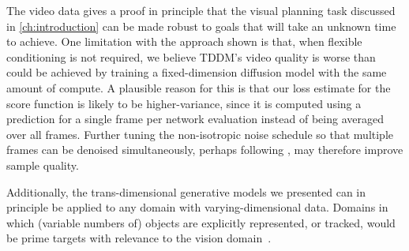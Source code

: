 The video data gives a proof in principle that the visual planning task discussed in \cref{ch:introduction} can be made robust to goals that will take an unknown time to achieve. One limitation with the approach shown is that, when flexible conditioning is not required, we believe TDDM's video quality is worse than could be achieved by training a fixed-dimension diffusion model with the same amount of compute. A plausible reason for this is that our loss estimate for the score function is likely to be higher-variance, since it is computed using a prediction for a single frame per network evaluation instead of being averaged over all frames. Further tuning the non-isotropic noise schedule so that multiple frames can be denoised simultaneously, perhaps following \citet{ruhe2024rolling}, may therefore improve sample quality.

Additionally, the trans-dimensional generative models we presented can in principle be applied to any domain with varying-dimensional data. Domains in which (variable numbers of) objects are explicitly represented, or tracked, would be prime targets with relevance to the vision domain~\citep{luo2021multiple,niedoba2024diffusion}. 